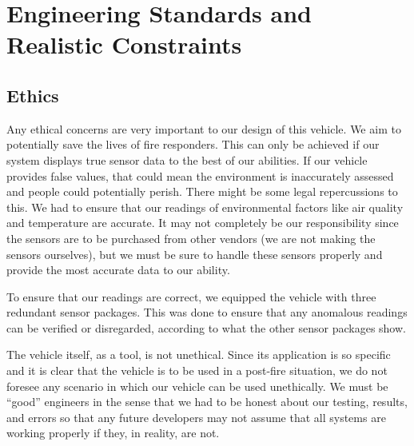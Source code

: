 \chapter{Engineering Standards and Realistic Constraints}
\section{Ethics} Any ethical concerns are very important to our design of this vehicle. We aim to potentially save the lives of fire responders. This can only be achieved if our system displays true sensor data to the best of our abilities. If our vehicle provides false values, that could mean the environment is inaccurately assessed and people could potentially perish. There might be some legal repercussions to this. We had to ensure that our readings of environmental factors like air quality and temperature are accurate. It may not completely be our responsibility since the sensors are to be purchased from other vendors (we are not making the sensors ourselves), but we must be sure to handle these sensors properly and provide the most accurate data to our ability. 

To ensure that our readings are correct, we equipped the vehicle with three redundant sensor packages. This was done to ensure that any anomalous readings can be verified or disregarded, according to what the other sensor packages show.

	The vehicle itself, as a tool, is not unethical. Since its application is so specific and it is clear that the vehicle is to be used in a post-fire situation, we do not foresee any scenario in which our vehicle can be used unethically. We must be “good” engineers in the sense that we had to be honest about our testing, results, and errors so that any future developers may not assume that all systems are working properly if they, in reality, are not. 

